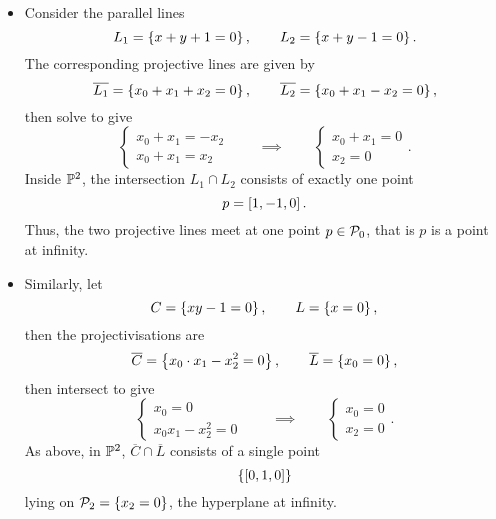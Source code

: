 \begin{example}
\hfill
\begin{itemize}
\item Consider the parallel lines
$$ L_1 = \cb{x + y + 1 = 0}, \qquad L_2 = \cb{x + y - 1 = 0}. $$
The corresponding projective lines are given by
$$ \overline{L_1} = \cb{x_0 + x_1 + x_2 = 0}, \qquad \overline{L_2} = \cb{x_0 + x_1 - x_2 = 0}, $$
then solve to give
$$
\begin{cases}
x_0 + x_1 = -x_2 \\
x_0 + x_1 = x_2
\end{cases}
\qquad \implies \qquad
\begin{cases}
x_0 + x_1 = 0 \\
x_2 = 0
\end{cases}.
$$
Inside $ \P^2 $, the intersection $ L_1 \cap L_2 $ consists of exactly one point
$$ p = \sb{1, -1, 0}. $$
Thus, the two projective lines meet at one point $ p \in \PP_0 $, that is $ p $ is a point at infinity.
\item Similarly, let
$$ C = \cb{xy - 1 = 0}, \qquad L = \cb{x = 0}, $$
then the projectivisations are
$$ \overline{C} = \cb{x_0 \cdot x_1 - x_2^2 = 0}, \qquad \overline{L} = \cb{x_0 = 0}, $$
then intersect to give
$$
\begin{cases}
x_0 = 0 \\
x_0x_1 - x_2^2 = 0
\end{cases}
\qquad \implies \qquad
\begin{cases}
x_0 = 0 \\
x_2 = 0
\end{cases}.
$$
As above, in $ \P^2 $, $ \overline{C} \cap \overline{L} $ consists of a single point
$$ \cb{\sb{0, 1, 0}} $$
lying on $ \PP_2 = \cb{x_2 = 0} $, the hyperplane at infinity.
\end{itemize}
\end{example}

\pagebreak

